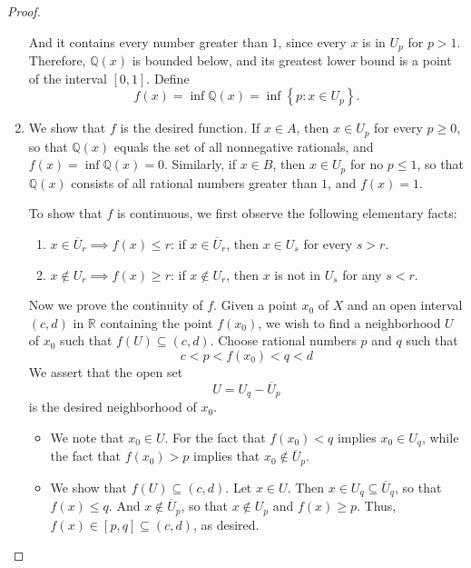 \begin{proof}
\begin{enumerate}
      And it contains every number greater than \( 1 \), since every \( x \) is in \( U_p \) for \( p > 1 \).
      Therefore, \( \mathbb{Q}(x) \) is bounded below, and its greatest lower bound is a point of the interval \( [0, 1] \).
      Define
      \[
        f(x) = \inf \mathbb{Q}(x) = \inf \left\lbrace p: x \in U_p \right\rbrace.
      \]
    \item We show that \( f \) is the desired function.
      If \( x \in A \), then \( x \in U_p \) for every \( p \geq 0 \), so that \( \mathbb{Q}(x) \) equals the set of all nonnegative rationals, and \( f(x) = \inf \mathbb{Q}(x) = 0 \).
      Similarly, if \( x \in B \), then \( x \in U_p \) for no \( p \leq 1 \), so that \( \mathbb{Q}(x) \) consists of all rational numbers greater than \( 1 \), and \( f(x) = 1 \).
      
      To show that \( f \) is continuous, we first observe the following elementary facts:
      \begin{enumerate}
        \item \( x \in \overline{U}_r \implies f(x) \leq r \): if \( x \in \overline{U}_r \), then \( x \in U_s \) for every \( s > r \).
        \item \( x \notin U_r \implies f(x) \geq r \): if \( x \notin U_r \), then \( x \) is not in \( U_s \) for any \( s < r \).
      \end{enumerate}
      Now we prove the continuity of \( f \).
      Given a point \( x_0 \) of \( X \) and an open interval \( (c, d) \) in \( \mathbb{R} \) containing the point \( f(x_0) \), we wish to find a neighborhood \( U \) of \( x_0 \) such that \( f(U) \subseteq (c, d) \).
      Choose rational numbers \( p \) and \( q \) such that
      \[
        c < p < f(x_0) < q < d
      \]
      We assert that the open set
      \[
        U = U_q - \overline{U}_p
      \]
      is the desired neighborhood of \( x_0 \).
      \begin{itemize}
        \item We note that \( x_0 \in U \).
          For the fact that \( f(x_0) < q \) implies \( x_0 \in U_q \), while the fact that \( f(x_0) > p \) implies that \( x_0 \notin \overline{U}_p \).
        \item We show that \( f(U) \subseteq (c, d) \).
          Let \( x \in U \).
          Then \( x \in U_q \subseteq \overline{U}_q \), so that \( f(x) \leq q \).
          And \( x \notin \overline{U}_p \), so that \( x \notin U_p \) and \( f(x) \geq p \).
          Thus, \( f(x) \in [p, q] \subseteq (c, d) \), as desired.
      \end{itemize}
  \end{enumerate}
\end{proof}

